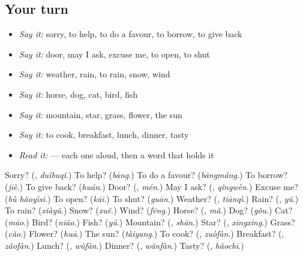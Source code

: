 \subsection*{Your turn}
\begin{itemize}
\raggedright
  \item \emph{Say it:} sorry, to help, to do a favour, to borrow, to give back
  \item \emph{Say it:} door, may I ask, excuse me, to open, to shut
  \item \emph{Say it:} weather, rain, to rain, snow, wind
  \item \emph{Say it:} horse, dog, cat, bird, fish
  \item \emph{Say it:} mountain, star, grass, flower, the sun
  \item \emph{Say it:} to cook, breakfast, lunch, dinner, tasty
  \item \emph{Read it:}         — each one aloud, then a word that holds it
\end{itemize}

\begin{tcolorbox}[breakable,colback=teal!4,colframe=teal!35!black,title={Before you move on}]
Sorry? (\textbf{}, \emph{duìbuqǐ}.) To help? (\emph{bāng}.) To do a favour? (\emph{bāngmáng}.) To borrow? (\emph{jiè}.) To give back? (\emph{huán}.) Door? (\textbf{}, \emph{mén}.) May I ask? (\textbf{}, \emph{qǐngwèn}.) Excuse me? (\emph{bù hǎoyìsi}.) To open? (\emph{kāi}.) To shut? (\emph{guān}.) Weather? (\textbf{}, \emph{tiānqì}.) Rain? (\textbf{}, \emph{yǔ}.) To rain? (\emph{xiàyǔ}.) Snow? (\emph{xuě}.) Wind? (\emph{fēng}.) Horse? (\textbf{}, \emph{mǎ}.) Dog? (\emph{gǒu}.) Cat? (\emph{māo}.) Bird? (\emph{niǎo}.) Fish? (\emph{yú}.) Mountain? (\textbf{}, \emph{shān}.) Star? (\textbf{}, \emph{xīngxing}.) Grass? (\emph{cǎo}.) Flower? (\emph{huā}.) The sun? (\emph{tàiyang}.) To cook? (\textbf{}, \emph{zuòfàn}.) Breakfast? (\textbf{}, \emph{zǎofàn}.) Lunch? (\textbf{}, \emph{wǔfàn}.) Dinner? (\textbf{}, \emph{wǎnfàn}.) Tasty? (\textbf{}, \emph{hǎochī}.)
\end{tcolorbox}
